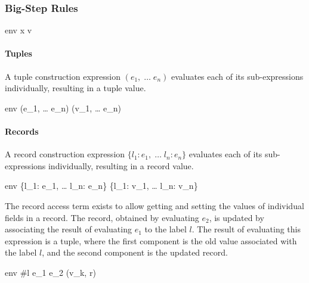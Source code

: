 \documentclass{article}
\begin{document}
\subsubsection{Big-Step Rules}




    {\mbox{env} \vdash x \Downarrow v}


\paragraph{Tuples}
A tuple construction expression $(e_1, \; \dots \; e_n)$ evaluates each of its sub-expressions individually, resulting in a tuple value.

    {\mbox{env} \vdash (e_1, \; \dots \; e_n) \Downarrow (v_1, \; \dots \; e_n)}

\paragraph{Records}
A record construction expression $\{l_1: e_1, \; \dots \; l_n: e_n\}$ evaluates each of its sub-expressions individually, resulting in a record value.

    {\mbox{env} \vdash \{l_1: e_1, \; \dots \; l_n: e_n\} \Downarrow \{l_1: v_1, \; \dots \; l_n: v_n\}}

The record access term exists to allow getting and setting the values of individual fields in a record.
The record, obtained by evaluating $e_2$, is updated by associating the result of evaluating $e_1$ to the label $l$.
The result of evaluating this expression is a tuple, where the first component is the old value associated with the label $l$, and the second component is the updated record.

    {\mbox{env} \vdash \#l \; e_1 \; e_2 \Downarrow (v_k, r)}
\end{document}
